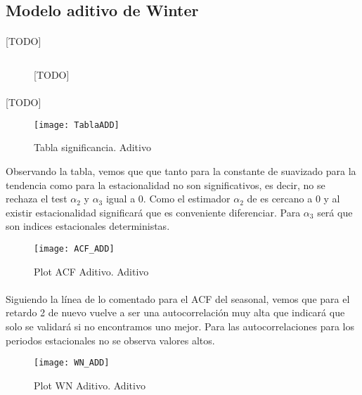 \documentclass[a4paper, spanish]{article}
\begin{document}
    \subsection{Modelo aditivo de Winter}

      \paragraph{}
      [TODO]

      \begin{figure}[h!]
        \centering
        \inputminted{SAS}{./res/code/b-01-esm-2.sas}
        \caption{[TODO]}
        \label{code:b_esm_2}
      \end{figure}

      \paragraph{}
      [TODO]

      \begin{figure}[h!]
        \centering
        \texttt{[image: TablaADD]}
        \caption{Tabla significancia. Aditivo}
        \label{}
      \end{figure}

      Observando la tabla, vemos que que tanto para la constante de suavizado para la tendencia como para la estacionalidad no son significativos, es decir, no se rechaza el test $\alpha_2$ y $\alpha_3$ igual a 0. Como el estimador $\alpha_2$ de es cercano a 0 y al existir estacionalidad significará que es conveniente diferenciar. Para $\alpha_3$ será que son indices estacionales deterministas.

      \begin{figure}[h!]
        \centering
        \texttt{[image: ACF\_ADD]}
        \caption{Plot ACF Aditivo. Aditivo}
        \label{}
      \end{figure}

      \paragraph{}
      Siguiendo la línea de lo comentado para el ACF del seasonal, vemos que para el retardo 2 de nuevo vuelve a ser una autocorrelación muy alta que indicará que solo se validará si no encontramos uno mejor. Para las autocorrelaciones para los periodos estacionales no se observa valores altos.

      \begin{figure}[h!]
        \centering
        \texttt{[image: WN\_ADD]}
        \caption{Plot WN Aditivo. Aditivo}
        \label{}
      \end{figure}
\end{document}

